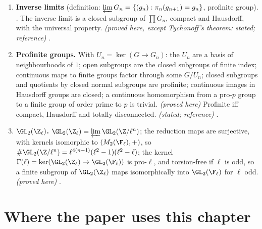 \begin{enumerate}[label=\textbf{\thechapter.\arabic*}]
.
\item \textbf{Inverse limits} (definition: $\varprojlim G_n=\{(g_n):\pi_n(g_{n+1})=g_n\}$, profinite group). . The inverse
limit is a closed subgroup of $\prod G_n$, compact and Hausdorff, with the universal property. \emph{(proved here, except Tychonoff's
theorem: stated; reference)} .
\item \textbf{Profinite groups.} With $U_n=\ker(G\to G_n)$: the $U_n$ are a basis of neighbourhoods of $1$; open subgroups are the closed
subgroups of finite index; continuous maps to finite groups factor through some $G/U_n$; closed subgroups and quotients by closed
normal subgroups are profinite; continuous images in Hausdorff groups are closed; a continuous homomorphism from a pro-$p$ group
to a finite group of order prime to $p$ is trivial. \emph{(proved here)} Profinite iff compact, Hausdorff and totally disconnected.
\emph{(stated; reference)} .
\item \textbf{$\GL_2(\Z_\ell)$.} $\GL_2(\Z_\ell)=\varprojlim\GL_2(\Z/\ell^n)$; the reduction maps are surjective, with kernels isomorphic to $(M_2(\F_\ell),+)$, so
$\#\GL_2(\Z/\ell^n)=\ell^{4(n-1)}(\ell^2-1)(\ell^2-\ell)$; the kernel $\Gamma(\ell)=\ker(\GL_2(\Z_\ell)\to\GL_2(\F_\ell))$ is pro-$\ell$, and torsion-free if $\ell$ is odd, so a
finite subgroup of $\GL_2(\Z_\ell)$ maps isomorphically into $\GL_2(\F_\ell)$ for $\ell$ odd. \emph{(proved here)} .
\end{enumerate}

\section*{Where the paper uses this chapter}

